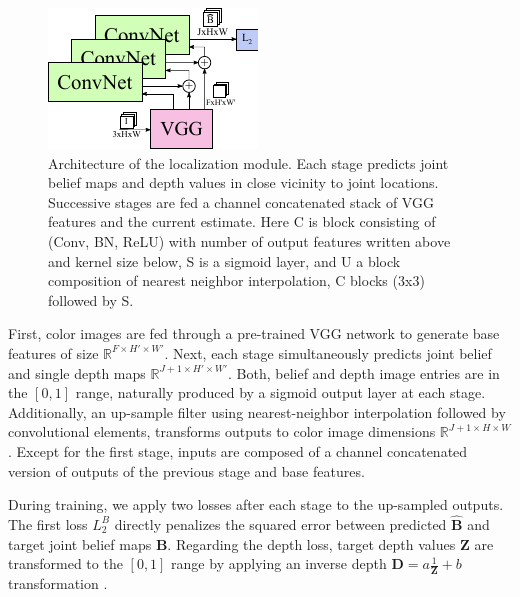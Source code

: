 \documentclass[conference]{IEEEtran}
\begin{document}
    \begin{figure} [!h]
        \centering
        \includegraphics[width=0.8\columnwidth]{figures/joint_model/joint_model.pdf}
        \caption {
            \label{fig:jointmodel} 
            Architecture of the localization module. Each stage predicts joint belief maps and depth values in close vicinity to joint locations. Successive stages are fed a channel concatenated stack of VGG features and the current estimate. Here C is block consisting of (Conv, BN, ReLU) with number of output features written above and kernel size below, S is a sigmoid layer, and U a block composition of nearest neighbor interpolation, C blocks (3x3) followed by S.
        }
    \end{figure}

    First, color images are fed through a pre-trained VGG \cite{simonyan2014very} network to generate base features of size $\mathbb{R}^{F \times H' \times W'}$. Next, each stage simultaneously predicts joint belief and single depth maps $\mathbb{R}^{J+1 \times H' \times W'}$. Both, belief and depth image entries are in the $\left[0,1\right]$ range, naturally produced by a sigmoid output layer at each stage. Additionally, an up-sample filter using nearest-neighbor interpolation followed by convolutional elements, transforms outputs to color image dimensions $\mathbb{R}^{J+1 \times H \times W}$. Except for the first stage, inputs are composed of a channel concatenated version of outputs of the previous stage and base features. 

    During training, we apply two losses after each stage to the up-sampled outputs. The first loss $L_2^B$ directly penalizes the squared error between predicted $\hat{\mathbf{B}}$ and target joint belief maps $\mathbf{B}$. Regarding the depth loss, target depth values $\mathbf{Z}$ are transformed to the $\left[0,1\right]$ range by applying an inverse depth $\mathbf{D}=a\frac{1}{\mathbf{Z}} + b$ transformation \cite{hartley2003multiple}.
\end{document}
